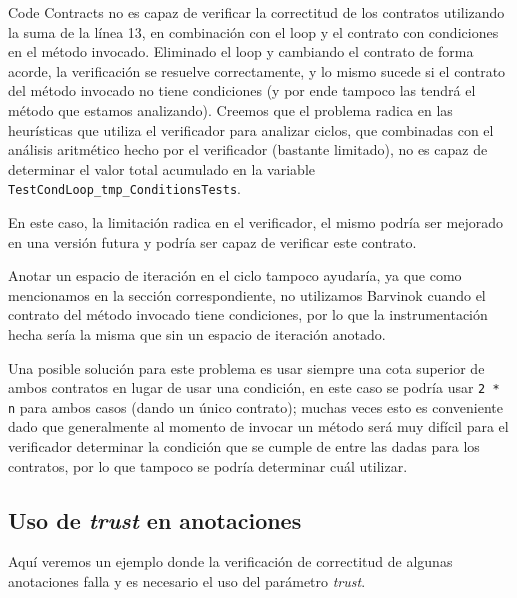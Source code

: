 \documentclass[12pt,a4paper]{article}
\newcommand\mono[1]{\texttt{#1}}
\begin{document}
			Code Contracts no es capaz de verificar la correctitud de los contratos utilizando la suma de la línea 13, en combinación con el loop y el contrato con condiciones en el método invocado. Eliminado el loop y cambiando el contrato de forma acorde, la verificación se resuelve correctamente, y lo mismo sucede si el contrato del método invocado no tiene condiciones (y por ende tampoco las tendrá el método que estamos analizando). Creemos que el problema radica en las heurísticas que utiliza el verificador para analizar ciclos, que combinadas con el análisis aritmético hecho por el verificador (bastante limitado), no es capaz de determinar el valor total acumulado en la variable \mono{TestCondLoop\_tmp\_ConditionsTests}.

			En este caso, la limitación radica en el verificador, el mismo podría ser mejorado en una versión futura y podría ser capaz de verificar este contrato.

			Anotar un espacio de iteración en el ciclo tampoco ayudaría, ya que como mencionamos en la sección correspondiente, no utilizamos Barvinok cuando el contrato del método invocado tiene condiciones, por lo que la instrumentación hecha sería la misma que sin un espacio de iteración anotado.

			Una posible solución para este problema es usar siempre una cota superior de ambos contratos en lugar de usar una condición, en este caso se podría usar \mono{2 * n} para ambos casos (dando un único contrato); muchas veces esto es conveniente dado que generalmente al momento de invocar un método será muy difícil para el verificador determinar la condición que se cumple de entre las dadas para los contratos, por lo que tampoco se podría determinar cuál utilizar.
		\subsection{Uso de \textit{trust} en anotaciones}
			Aquí veremos un ejemplo donde la verificación de correctitud de algunas anotaciones falla y es necesario el uso del parámetro \textit{trust}.
\end{document}
